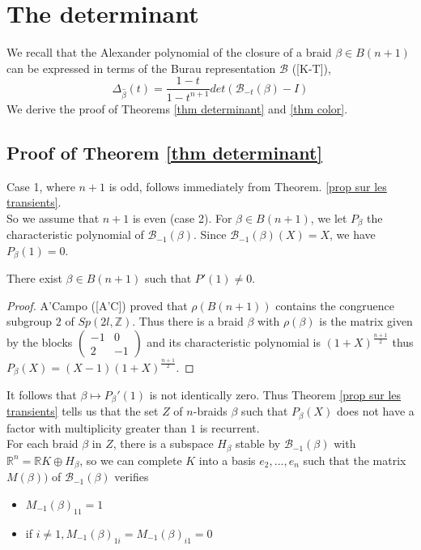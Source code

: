 \documentclass[12pt]{article}
\begin{document}
\section{The determinant} 
We recall that the Alexander polynomial of the closure of a braid $\beta\in B(n+1)$ can be expressed in terms of the Burau representation $\mathcal B$ ([K-T]),
\begin{equation}\label{burau et alexander}
\Delta_{\hat{\beta}}(t)=\frac{1-t}{1-t^{n+1}}det({\mathcal B}_{-t}(\beta)-I)
\end{equation}
We derive the proof of Theorems \ref{thm determinant} and \ref{thm color}.
\subsection{Proof of Theorem \ref{thm determinant}}\label{proof determinant}
	Case 1, where $n+1$ is odd, follows immediately from Theorem. \ref{prop sur les transients}.\\
	So we assume that $n+1$ is even (case 2). For $\beta\in B(n+1)$, we let $P_\beta$ the characteristic polynomial of $\mathcal B_{-1}(\beta)$. Since  $\mathcal B_{-1}(\beta)(X)=X$, we have $P_\beta(1)=0$.
	\begin{lem}
		There exist $\beta\in B(n+1)$ such that $P'(1)\neq 0$.
	\end{lem}
\begin{proof}
A'Campo ([A'C]) proved that $\rho(B(n+1))$ contains the congruence subgroup $2$ of $Sp(2l,\mathbb{Z})$. Thus there is a braid $\beta$ with $\rho(\beta)$ is the matrix given by the blocks $\begin{pmatrix}-1&0\\2&-1\end{pmatrix}$ and its characteristic polynomial is $(1+X)^{\frac{n+1}{2}}$ thus $P_\beta(X)=(X-1)(1+X)^{\frac{n+1}{2}}$.\end{proof}
It follows that $\beta\mapsto P_\beta'(1)$ is not identically zero. Thus Theorem \ref{prop sur les transients} tells us that the set $Z$ of $n$-braids $\beta$ such that $P_\beta(X)$ does not have a factor with multiplicity greater than $1$ is recurrent. \\
For each braid $\beta$ in $Z$, there is a subspace $H_\beta$ stable by ${\mathcal B}_{-1}(\beta)$ with $\mathbb{R}^{n}=\mathbb{R}K\oplus H_\beta$, so we can complete $K$ into a basis $e_2,...,e_{n}$ such that the matrix $M(\beta))$ of ${\mathcal B}_{-1}(\beta)$ verifies 
	\begin{itemize}
		\item
		$M_{-1}(\beta)_{11}=1$
		\item if $i\neq 1, M_{-1}(\beta)_{1i}=M_{-1}(\beta)_{i1}=0$
	\end{itemize}
\end{document}

